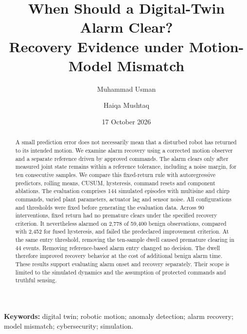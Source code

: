 \documentclass[11pt,a4paper]{article}
\title{When Should a Digital-Twin Alarm Clear?\\Recovery Evidence under Motion-Model Mismatch}
\author{Muhammad Usman \and Haiqa Mushtaq}
\date{17 October 2026}
\begin{document}
\maketitle
\begin{abstract}
A small prediction error does not necessarily mean that a disturbed robot has returned to its intended motion. We examine alarm recovery using a corrected motion observer and a separate reference driven by approved commands. The alarm clears only after measured joint state remains within a reference tolerance, including a noise margin, for ten consecutive samples. We compare this fixed-return rule with autoregressive predictors, rolling means, CUSUM, hysteresis, command resets and component ablations. The evaluation comprises 144 simulated episodes with multisine and chirp commands, varied plant parameters, actuator lag and sensor noise. All configurations and thresholds were fixed before generating the evaluation data. Across 90 interventions, fixed return had no premature clears under the specified recovery criterion. It nevertheless alarmed on 2,778 of 59,400 benign observations, compared with 2,452 for fused hysteresis, and failed the predeclared improvement criterion. At the same entry threshold, removing the ten-sample dwell caused premature clearing in 44 events. Removing reference-based alarm entry changed no decision. The dwell therefore improved recovery behavior at the cost of additional benign alarm time. These results support evaluating alarm onset and recovery separately. Their scope is limited to the simulated dynamics and the assumption of protected commands and truthful sensing.
\end{abstract}
\noindent\textbf{Keywords:} digital twin; robotic motion; anomaly detection; alarm recovery; model mismatch; cybersecurity; simulation.





\clearpage
\appendix

\clearpage


\end{document}
